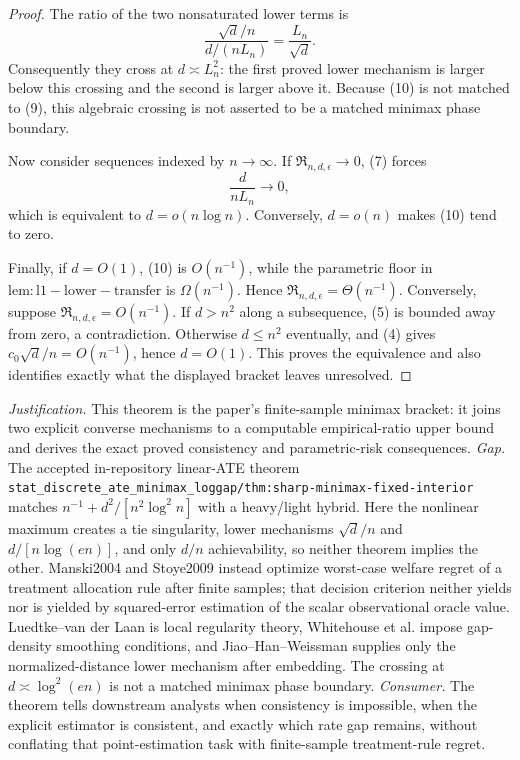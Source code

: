 \documentclass{article}
\begin{document}
\begin{proof}
The ratio of the two nonsaturated lower terms is
\[
 \frac{\sqrt d/n}{d/(nL_n)}=\frac{L_n}{\sqrt d}.
\]
Consequently they cross at \(d\asymp L_n^2\): the first proved lower mechanism is larger below this crossing and the second is larger above it.  Because (10) is not matched to (9), this algebraic crossing is not asserted to be a matched minimax phase boundary.

Now consider sequences indexed by \(n\to\infty\).  If \(\mathfrak R_{n,d,\epsilon}\to0\), (7) forces
\[
 \frac d{nL_n}\longrightarrow0,
\]
which is equivalent to \(d=o(n\log n)\).  Conversely, \(d=o(n)\) makes (10) tend to zero.

Finally, if \(d=O(1)\), (10) is \(O(n^{-1})\), while the parametric floor in \(\mathrm{lem:l1-lower-transfer}\) is \(\Omega(n^{-1})\).  Hence \(\mathfrak R_{n,d,\epsilon}=\Theta(n^{-1})\).  Conversely, suppose \(\mathfrak R_{n,d,\epsilon}=O(n^{-1})\).  If \(d>n^2\) along a subsequence, (5) is bounded away from zero, a contradiction.  Otherwise \(d\le n^2\) eventually, and (4) gives \(c_0\sqrt d/n=O(n^{-1})\), hence \(d=O(1)\).  This proves the equivalence and also identifies exactly what the displayed bracket leaves unresolved.
\end{proof}
\par\smallskip\noindent \textit{Justification.} This theorem is the paper's finite-sample minimax bracket: it joins two explicit converse mechanisms to a computable empirical-ratio upper bound and derives the exact proved consistency and parametric-risk consequences. \textit{Gap.} The accepted in-repository linear-ATE theorem \texttt{stat\_discrete\_ate\_minimax\_loggap/thm:sharp-minimax-fixed-interior} matches \(n^{-1}+d^2/[n^2\log^2 n]\) with a heavy/light hybrid. Here the nonlinear maximum creates a tie singularity, lower mechanisms \(\sqrt d/n\) and \(d/[n\log(en)]\), and only \(d/n\) achievability, so neither theorem implies the other. Manski2004 and Stoye2009 instead optimize worst-case welfare regret of a treatment allocation rule after finite samples; that decision criterion neither yields nor is yielded by squared-error estimation of the scalar observational oracle value. Luedtke--van der Laan is local regularity theory, Whitehouse et al. impose gap-density smoothing conditions, and Jiao--Han--Weissman supplies only the normalized-distance lower mechanism after embedding. The crossing at \(d\asymp\log^2(en)\) is not a matched minimax phase boundary. \textit{Consumer.} The theorem tells downstream analysts when consistency is impossible, when the explicit estimator is consistent, and exactly which rate gap remains, without conflating that point-estimation task with finite-sample treatment-rule regret.
\end{document}

